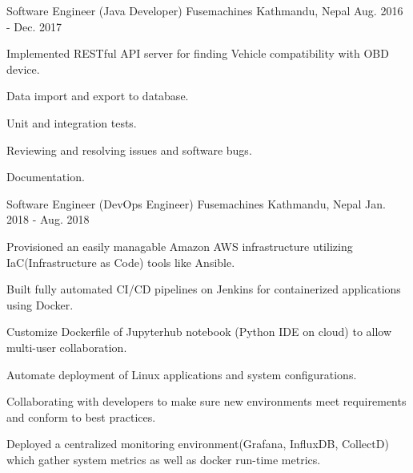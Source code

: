 

\begin{cventries}

  \cventry
    {Software Engineer (Java Developer)} %
    {Fusemachines} %
    {Kathmandu, Nepal} %
    {Aug. 2016 - Dec. 2017} %
    {
      \begin{cvitems} %
        \item {Implemented RESTful API server for finding Vehicle compatibility with OBD device.}
        \item {Data import and export to database.}  
        \item {Unit and integration tests.}        
        \item {Reviewing and resolving issues and software bugs.}   
        \item {Documentation.}        
      \end{cvitems}
    }

  \cventry
    {Software Engineer (DevOps Engineer)} %
    {Fusemachines} %
    {Kathmandu, Nepal} %
    {Jan. 2018 - Aug. 2018} %
    {
      \begin{cvitems} %
        \item {Provisioned an easily managable Amazon AWS infrastructure utilizing IaC(Infrastructure as Code) tools like Ansible.}
        \item {Built fully automated CI/CD pipelines on Jenkins for containerized applications using Docker.}
        \item {Customize Dockerfile of Jupyterhub notebook (Python IDE on cloud) to allow multi-user collaboration.}
        \item {Automate deployment of Linux applications and system
configurations.}
        \item {Collaborating with developers to make sure new environments meet requirements and conform to best practices.}
        \item {Deployed a centralized monitoring environment(Grafana, InfluxDB, CollectD) which gather system metrics as well as docker run-time metrics.}
      \end{cvitems}
    }


\end{cventries}
